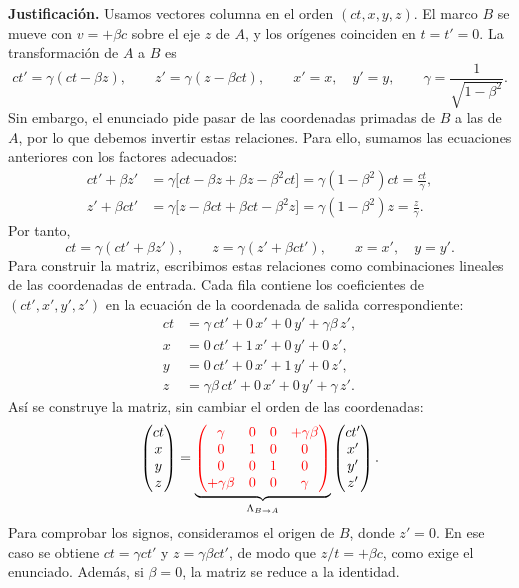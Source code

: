 \documentclass[a4paper,11pt]{article}
\begin{document}
\textbf{Justificación.} Usamos vectores columna en el orden $(ct,x,y,z)$. El marco $B$ se mueve con $v=+\beta c$ sobre el eje $z$ de $A$, y los orígenes coinciden en $t=t'=0$. La transformación de $A$ a $B$ es
\[
ct'=\gamma(ct-\beta z),\qquad z'=\gamma(z-\beta ct),
\qquad x'=x,\quad y'=y,\qquad
\gamma=\frac{1}{\sqrt{1-\beta^2}}.
\]
Sin embargo, el enunciado pide pasar de las coordenadas primadas de $B$ a las de $A$, por lo que debemos invertir estas relaciones. Para ello, sumamos las ecuaciones anteriores con los factores adecuados:
\[
\begin{aligned}
ct'+\beta z'&=\gamma\bigl[ct-\beta z+\beta z-\beta^2ct\bigr]
=\gamma(1-\beta^2)ct=\frac{ct}{\gamma},\\
z'+\beta ct'&=\gamma\bigl[z-\beta ct+\beta ct-\beta^2z\bigr]
=\gamma(1-\beta^2)z=\frac{z}{\gamma}.
\end{aligned}
\]
Por tanto,
\[
ct=\gamma(ct'+\beta z'),
\qquad z=\gamma(z'+\beta ct'),
\qquad x=x',\quad y=y'.
\]
Para construir la matriz, escribimos estas relaciones como combinaciones lineales de las coordenadas de entrada. Cada fila contiene los coeficientes de $(ct',x',y',z')$ en la ecuación de la coordenada de salida correspondiente:
\[
\begin{aligned}
ct&=\gamma\,ct'+0\,x'+0\,y'+\gamma\beta\,z',\\
x&=0\,ct'+1\,x'+0\,y'+0\,z',\\
y&=0\,ct'+0\,x'+1\,y'+0\,z',\\
z&=\gamma\beta\,ct'+0\,x'+0\,y'+\gamma\,z'.
\end{aligned}
\]
Así se construye la matriz, sin cambiar el orden de las coordenadas:
\[
\begin{pmatrix}ct\\x\\y\\z\end{pmatrix}
=\underbrace{\textcolor{red}{
\begin{pmatrix}
\gamma & 0 & 0 & +\gamma\beta \\
0 & 1 & 0 & 0 \\
0 & 0 & 1 & 0 \\
+\gamma\beta & 0 & 0 & \gamma
\end{pmatrix}}}_{\Lambda_{B\to A}}
\begin{pmatrix}ct'\\x'\\y'\\z'\end{pmatrix}.
\]
Para comprobar los signos, consideramos el origen de $B$, donde $z'=0$. En ese caso se obtiene $ct=\gamma ct'$ y $z=\gamma\beta ct'$, de modo que $z/t=+\beta c$, como exige el enunciado. Además, si $\beta=0$, la matriz se reduce a la identidad.
\end{document}
